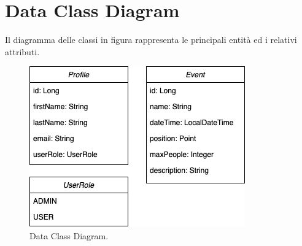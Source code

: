 \section{Data Class Diagram}
Il diagramma delle classi in figura rappresenta le principali entità ed i relativi attributi.
\begin{figure}[h!]
	\centering
	\includegraphics[width=0.8\linewidth]{diagrammi/classdiagram.png}
	\caption{Data Class Diagram.}
	\label{fig:DataClassDiagram}
\end{figure}